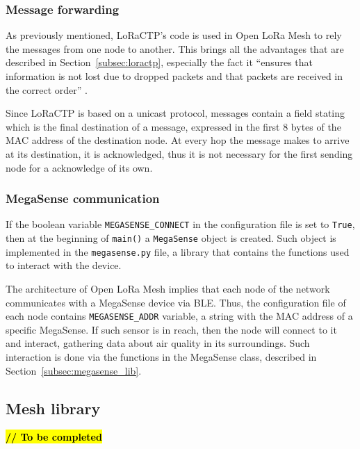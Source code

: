 			\subsubsection{Message forwarding}
			
				As previously mentioned, LoRaCTP's code is used in Open LoRa Mesh to rely the messages from one node to another.
				This brings all the advantages that are described in Section~\ref{subsec:loractp}, especially the fact it ``ensures that information is not lost due to dropped packets and that packets are received in the correct order'' \cite{loractp}.
				
				Since LoRaCTP is based on a unicast protocol, messages contain a field stating which is the final destination of a message, expressed in the first 8 bytes of the MAC address of the destination node.
				At every hop the message makes to arrive at its destination, it is acknowledged, thus it is not necessary for the first sending node for a acknowledge of its own.
			
			\subsubsection{MegaSense communication}
			
				If the boolean variable \texttt{MEGASENSE\_CONNECT} in the configuration file is set to \texttt{True}, then at the beginning of \texttt{main()} a \texttt{MegaSense} object is created.
				Such object is implemented in the \texttt{megasense.py} file, a library that contains the functions used to interact with the device.
				
				The architecture of Open LoRa Mesh implies that each node of the network communicates with a MegaSense device via BLE.
				Thus, the configuration file of each node contains \texttt{MEGASENSE\_ADDR} variable, a string with the MAC address of a specific MegaSense.
				If such sensor is in reach, then the node will connect to it and interact, gathering data about air quality in its surroundings.
				Such interaction is done via the functions in the MegaSense class, described in Section~\ref{subsec:megasense_lib}.
				
		\subsection{Mesh library}\label{subsec:mesh_library}
		
				\textbf{\textcolor{red}{\hl{// To be completed}}}
		
